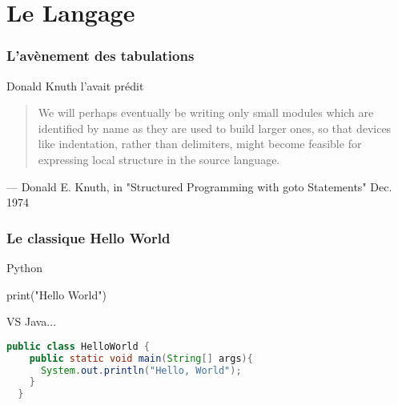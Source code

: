 \documentclass{beamer}
\begin{document}
\section{Le Langage}
\label{sec:language}

\begin{frame}[fragile]
  \frametitle{L'avènement des tabulations}

  \begin{block}{Donald Knuth l'avait prédit}
    \begin{quote}
      We will perhaps eventually be writing only small modules which are
      identified by name as they are used to build larger ones, so that
      devices like indentation, rather than delimiters, might become
      feasible for expressing local structure in the source language.   
    \end{quote}
    \centering
    \tiny
    — Donald E. Knuth, in "Structured Programming with goto
    Statements" Dec. 1974
  \end{block}


\end{frame}



\begin{frame}[fragile]
  \frametitle{Le classique Hello World}

    \begin{block}{Python}
    \begin{python}
  print("Hello World")
    \end{python}

    \end{block}

    \begin{block}{VS Java...}
    \begin{lstlisting}[language=Java]
  public class HelloWorld {
    public static void main(String[] args){
      System.out.println("Hello, World");
    }
  }
    \end{lstlisting}
  \end{block}
\end{frame}
\end{document}
